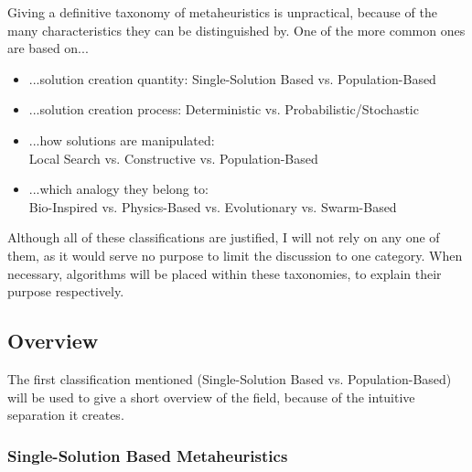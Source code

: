 Giving a definitive taxonomy of metaheuristics is unpractical, because of the many characteristics they can be distinguished by. 
One of the more common ones are based on...
\begin{itemize}
	\item ...solution creation quantity: Single-Solution Based vs. Population-Based
	\item ...solution creation process: Deterministic vs. Probabilistic/Stochastic
	\item ...how solutions are manipulated:\\ Local Search vs. Constructive vs. Population-Based \cite{sorensen2013metaheuristics}
	\item ...which analogy they belong to:\\ Bio-Inspired vs. Physics-Based vs. Evolutionary  vs. Swarm-Based
\end{itemize}

Although all of these classifications are justified, I will not rely on any one of them, as it would serve no purpose to limit the discussion to one category. When necessary, algorithms will be placed within these taxonomies, to explain their purpose respectively.

\subsection{Overview}

The first classification mentioned (Single-Solution Based vs. Population-Based) will be used to give a short overview of the field, because of the intuitive separation it creates. 

\subsubsection{Single-Solution Based Metaheuristics}

